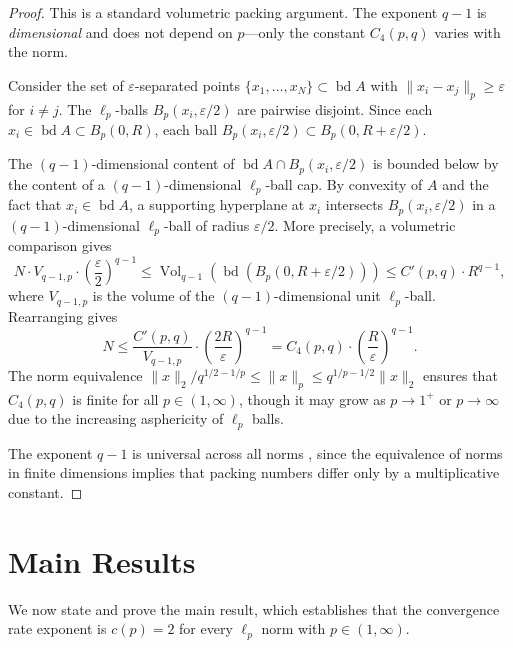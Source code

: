 \documentclass[11pt]{article}
\begin{document}
\begin{proof}
This is a standard volumetric packing argument. The exponent $q-1$ is \emph{dimensional} and does not depend on $p$---only the constant $C_4(p,q)$ varies with the norm.

Consider the set of $\varepsilon$-separated points $\{x_1, \ldots, x_N\} \subset \operatorname{bd} A$ with $\|x_i - x_j\|_p \ge \varepsilon$ for $i \neq j$. The $\ell_p$-balls $B_p(x_i, \varepsilon/2)$ are pairwise disjoint. Since each $x_i \in \operatorname{bd} A \subset B_p(0, R)$, each ball $B_p(x_i, \varepsilon/2) \subset B_p(0, R + \varepsilon/2)$.

The $(q-1)$-dimensional content of $\operatorname{bd} A \cap B_p(x_i, \varepsilon/2)$ is bounded below by the content of a $(q-1)$-dimensional $\ell_p$-ball cap. By convexity of $A$ and the fact that $x_i \in \operatorname{bd} A$, a supporting hyperplane at $x_i$ intersects $B_p(x_i, \varepsilon/2)$ in a $(q-1)$-dimensional $\ell_p$-ball of radius $\varepsilon/2$. More precisely, a volumetric comparison gives
\[
N \cdot V_{q-1,p} \cdot \left(\frac{\varepsilon}{2}\right)^{q-1} \le \operatorname{Vol}_{q-1}\left(\operatorname{bd}(B_p(0, R+\varepsilon/2))\right) \le C'(p,q) \cdot R^{q-1},
\]
where $V_{q-1,p}$ is the volume of the $(q-1)$-dimensional unit $\ell_p$-ball. Rearranging gives
\[
N \le \frac{C'(p,q)}{V_{q-1,p}} \cdot \left(\frac{2R}{\varepsilon}\right)^{q-1} = C_4(p,q) \cdot \left(\frac{R}{\varepsilon}\right)^{q-1}.
\]
The norm equivalence $\|x\|_2 / q^{1/2-1/p} \le \|x\|_p \le q^{1/p-1/2} \|x\|_2$ ensures that $C_4(p,q)$ is finite for all $p \in (1,\infty)$, though it may grow as $p \to 1^+$ or $p \to \infty$ due to the increasing asphericity of $\ell_p$ balls.

The exponent $q-1$ is universal across all norms \cite{Gruber1993,Glasauer1997,Gruber1982}, since the equivalence of norms in finite dimensions implies that packing numbers differ only by a multiplicative constant.
\end{proof}

\section{Main Results}\label{sec:main-results}

We now state and prove the main result, which establishes that the convergence rate exponent is $c(p) = 2$ for every $\ell_p$ norm with $p \in (1,\infty)$.
\end{document}

